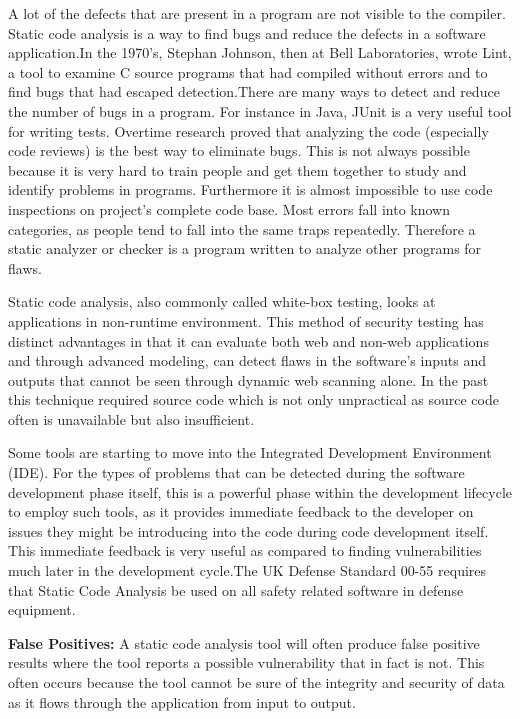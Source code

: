 A lot of the defects that are present in a program are not visible to the compiler. Static code analysis is a way to find bugs and reduce the defects in a software application.In the 1970's, Stephan Johnson, then at Bell Laboratories, wrote Lint, a tool to examine C
source programs that had compiled without errors and to find bugs that had escaped detection.There are many ways to detect and reduce the number of bugs in a program. For instance in Java, JUnit is a very useful tool for writing tests. Overtime research proved that analyzing the code (especially code reviews) is the best way to eliminate bugs. This is not
always possible because it is very hard to train people and get them together to study and identify problems in programs. Furthermore it is almost impossible to use code inspections on project's complete code base.
Most errors fall into known categories, as people tend to fall into the same traps repeatedly. Therefore a static analyzer or checker is a program written to analyze other programs for flaws. 

Static code analysis, also commonly called white-box testing, looks at applications in non-runtime environment. This method of security testing has distinct advantages in that it can evaluate both web and non-web applications and through advanced modeling, can detect flaws in the software's inputs and outputs that cannot be seen through dynamic web scanning alone. In the past this technique required source code which is not only unpractical as source code often is unavailable but also insufficient.

Some tools are starting to move into the Integrated Development Environment (IDE). For the types of problems that can be detected during the software development phase itself, this is a powerful phase within the development lifecycle to employ such tools, as it provides immediate feedback to the developer on issues they might be introducing into the code during code development itself. This immediate feedback is very useful as compared to finding vulnerabilities much later in the development cycle.The UK Defense Standard 00-55 requires that Static Code Analysis be used on all safety related software in defense equipment.

\textbf{False Positives:}
A static code analysis tool will often produce false positive results where the tool reports a possible vulnerability that in fact is not. This often occurs because the tool cannot be sure of the integrity and security of data as it flows through the application from input to output.

